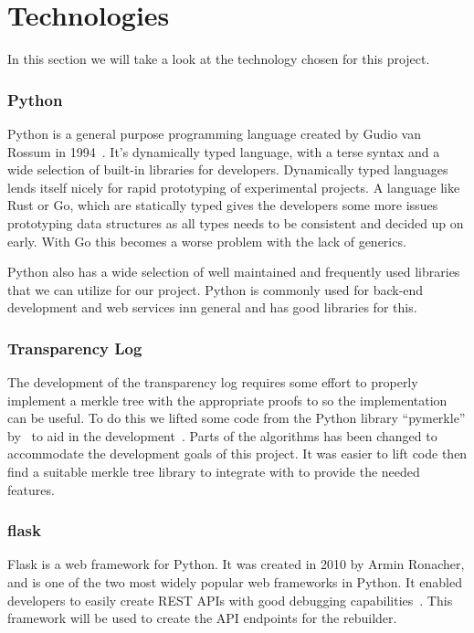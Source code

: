\documentclass[../Main/thesis.tex]{subfiles}
\begin{document}
\chapter{Technologies}\label{ch:technologies}
In this section we will take a look at the technology chosen for this project.

\subsection*{Python}
Python is a general purpose programming language created by Gudio van Rossum in
1994~\cite{python}. It's dynamically typed language, with a terse syntax and a wide selection
of built-in libraries for developers. Dynamically typed languages lends itself
nicely for rapid prototyping of experimental projects. A language like Rust or
Go, which are statically typed gives the developers some more issues prototyping
data structures as all types needs to be consistent and decided up on early.
With Go this becomes a worse problem with the lack of generics.

Python also has a wide selection of well maintained and frequently used
libraries that we can utilize for our project. Python is commonly used for
back-end development and web services inn general and has good libraries for
this.

\subsection*{Transparency Log}%
\label{sub:transparency_log_library}
The development of the transparency log requires some effort to properly
implement a merkle tree with the appropriate proofs to so the implementation can
be useful. To do this we lifted some code from the Python library ``pymerkle''
by~\citeauthor{pymerkeltools} to aid in the development~\cite{pymerkeltools}.
Parts of the algorithms has been changed to accommodate the development goals of
this project. It was easier to lift code then find a suitable merkle tree
library to integrate with to provide the needed features.

\subsection*{flask}
Flask is a web framework for Python. It was created in 2010 by Armin Ronacher,
and is one of the two most widely popular web frameworks in Python. It enabled
developers to easily create REST APIs with good debugging
capabilities~\cite{flask}. This framework will be used to create the API
endpoints for the rebuilder.
\end{document}
